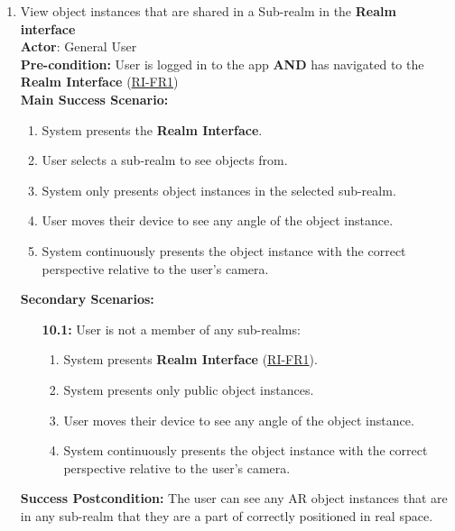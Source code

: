 \documentclass{article}
\begin{document}
\begin{enumerate}[label=\textbf{UC\arabic*}]
     
     \item \label{uc:10} View object instances that are shared in a Sub-realm in the \textbf{Realm interface} \\ 
        \textbf{Actor}: General User \\ 
        \textbf{Pre-condition:} User is logged in to the app \textbf{AND} has navigated to the \textbf{Realm Interface} (\hyperref[ssub:realm_interface]{RI-FR1}) \\
    
        \textbf{Main Success Scenario:}
        \begin{enumerate}[label=\textbf{\arabic*.}]
            \item System presents the \textbf{Realm Interface}.
            \item User selects a sub-realm to see objects from.
            \item System only presents object instances in the selected sub-realm.
            \item User moves their device to see any angle of the object instance.
            \item System continuously presents the object instance with the correct perspective relative to the user’s camera.
        \end{enumerate}
    
        \textbf{Secondary Scenarios:}
        \begin{itemize}
            \item[{\bf 10.1:}] User is not a member of any sub-realms:
            \begin{enumerate}[label=\textbf{\arabic*.}]
                \item System presents \textbf{Realm Interface} (\hyperref[ssub:realm_interface]{RI-FR1}).
                \item System presents only public object instances.
                \item User moves their device to see any angle of the object instance.
                \item System continuously presents the object instance with the correct perspective relative to the user’s camera.
            \end{enumerate}
        \end{itemize}
    
        \textbf{Success Postcondition:} The user can see any AR object instances that are in any sub-realm that they are a part of correctly positioned in real space.


\end{enumerate}
\end{document}
